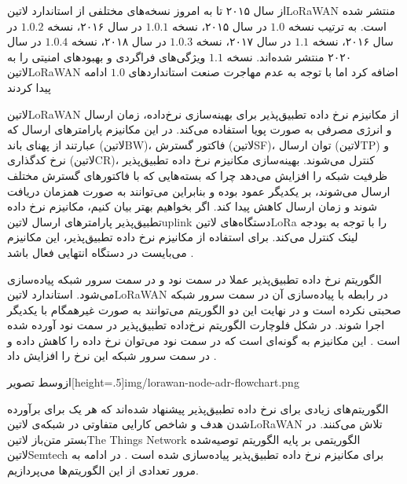 از سال ۲۰۱۵ تا به امروز نسخه‌های مختلفی از استاندارد ‌لاتین{LoRaWAN} منتشر شده است.
به ترتیب نسخه $1.0$ در سال ۲۰۱۵، نسخه $1.0.1$ در سال ۲۰۱۶، نسخه $1.0.2$ در سال ۲۰۱۶،
نسخه $1.1$ در سال ۲۰۱۷، نسخه $1.0.3$ در سال ۲۰۱۸، نسخه $1.0.4$ در سال ۲۰۲۰ منتشر شده‌اند.
نسخه $1.1$ ویژگی‌های فراگردی و بهبودهای امنیتی را به ‌لاتین{LoRaWAN} اضافه کرد اما با توجه به عدم مهاجرت
صنعت استانداردهای $1.0$ ادامه پیدا کردند


‌لاتین{LoRaWAN} از مکانیزم نرخ داده تطبیق‌پذیر برای بهینه‌سازی نرخ‌داده، زمان ارسال و انرژی مصرفی به صورت پویا استفاده می‌کند.
در این مکانیزم پارامترهای ارسال که عبارتند از پهنای باند (‌لاتین{BW})، فاکتور گسترش (‌لاتین{SF})،
توان ارسال (‌لاتین{TP}) و نرخ کدگذاری (‌لاتین{CR})، کنترل می‌شوند.
بهینه‌سازی مکانیزم نرخ داده تطبیق‌پذیر ظرفیت شبکه را افزایش می‌دهد چرا که بسته‌هایی که با فاکتورهای گسترش مختلف ارسال می‌شوند،
بر یکدیگر عمود بوده و بنابراین می‌توانند به صورت همزمان دریافت شوند و زمان ارسال کاهش پیدا کند.
اگر بخواهیم بهتر بیان کنیم، مکانیزم نرخ داده تطبیق‌پذیر پارامترهای ارسال ‌لاتین{uplink} دستگاه‌های ‌لاتین{LoRa}
را با توجه به بودجه لینک کنترل می‌کند. برای استفاده از مکانیزم نرخ داده تطبیق‌پذیر، این مکانیزم می‌بایست در دستگاه انتهایی فعال باشد
.

الگوریتم نرخ داده تطبیق‌پذیر عملا در سمت نود و در سمت سرور شبکه پیاده‌سازی می‌شود. استاندارد ‌لاتین{LoRaWAN}
در رابطه با پیاده‌سازی آن در سمت سرور شبکه صحبتی نکرده است و در نهایت این دو الگوریتم می‌توانند به صورت غیرهمگام با یکدیگر
اجرا شوند. در شکل  فلوچارت الگوریتم نرخ‌داده تطبیق‌پذیر
در سمت نود آورده شده است
.
این مکانیزم به گونه‌ای است که در سمت نود می‌توان نرخ داده را کاهش داده و در سمت سرور شبکه این نرخ را افزایش داد
.

‌ازوسط
‌تصویر[height=.5\textwidth]{img/lorawan-node-adr-flowchart.png}

الگوریتم‌های زیادی برای نرخ داده تطبیق‌پذیر پیشنهاد شده‌اند که هر یک برای برآورده شدن هدف و شاخص کارایی متفاوتی در شبکه‌ی ‌لاتین{LoRaWAN}
تلاش می‌کنند.
در بستر متن‌باز ‌لاتین{The Things Network}
الگوریتمی بر پایه الگوریتم توصیه‌شده ‌لاتین{Semtech} برای مکانیزم نرخ داده تطبیق‌پذیر پیاده‌سازی شده است
. در ادامه به مرور تعدادی از این الگوریتم‌ها می‌پردازیم.

